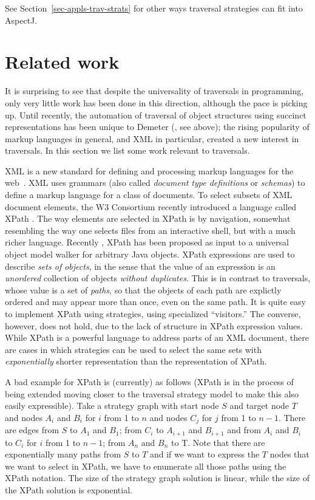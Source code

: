 See Section~\ref{sec-appls-trav-strats} for other ways traversal
strategies can fit into AspectJ.

\section{Related work}
\label{sec-related}
It is surprising to see that despite the universality of traversals in
programming, only very little work has been done in this direction,
although the pace is picking up.  Until recently, the automation of
traversal of object structures using succinct representations has been
unique to Demeter (\cite{lieber-nacho-cun:pp-cacm}, see above); the
rising popularity of markup languages in general, and XML in
particular, created a new interest in traversals. In this section we
list some work relevant to traversals.

XML is a new standard for defining and processing markup languages for
the web~\cite{XML}.  XML uses grammars (also called {\em document type
definitions} or {\em schemas\/}) to define a markup language for a
class of documents.  To select subsets of XML document elements, the
W3 Consortium recently introduced a language called XPath
\cite{XPath}.  The way elements are selected in XPath is by
navigation, somewhat resembling the way one selects files from an
interactive shell, but with a much richer language.  Recently
\cite{XPath-traversals}, XPath has been proposed as input to a
universal object model walker for arbitrary Java objects.  XPath
expressions are used to describe {\em sets of objects}, in the sense
that the value of an expression is an {\em unordered} collection of
objects {\em without duplicates}. This is in contrast to traversals,
whose value is a set of {\em paths}, so that the objects of each path
are explictly ordered and may appear more than once, even on the same
path. It is quite easy to implement XPath using strategies, using
specialized ``visitors.'' The converse, however, does not hold, due to
the lack of structure in XPath expression values.  While XPath is a
powerful language to address parts of an XML document, there are cases
in which strategies can be used to select the same sets with {\em
exponentially} shorter representation than the representation of
XPath.

A bad example for XPath is (currently) as follows (XPath is in the
process of being extended moving closer to the traversal strategy
model to make this also easily expressible). Take a strategy graph
with start node $S$ and target node $T$ and nodes $A_i$ and $B_i$ for
$i$ from 1 to $n$ and nodes $C_j$ for $j$ from 1 to $n-1$.  There are
edges from $S$ to $A_1$ and $B_1$; from $C_i$ to $A_{i+1}$ and
$B_{i+1}$ and from $A_i$ and $B_i$ to $C_i$ for $i$ from 1 to $n-1$;
from $A_n$ and $B_n$ to T.  Note that there are exponentially many
paths from $S$ to $T$ and if we want to express the $T$ nodes that we
want to select in XPath, we have to enumerate all those paths using
the XPath notation. The size of the strategy graph solution is linear,
while the size of the XPath solution is exponential.

